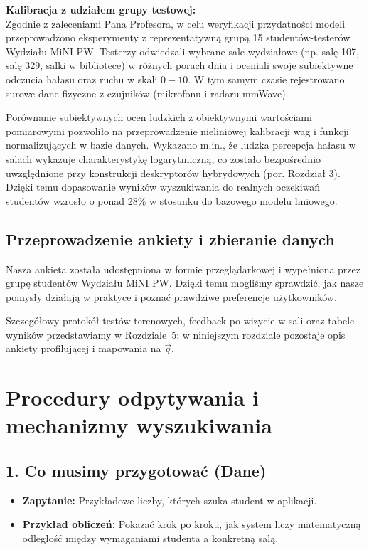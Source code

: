\documentclass[14pt,a4paper]{extarticle}
\begin{document}
\textbf{Kalibracja z udziałem grupy testowej:} \\
Zgodnie z zaleceniami Pana Profesora, w celu weryfikacji przydatności modeli przeprowadzono eksperymenty z reprezentatywną grupą 15 studentów-testerów Wydziału MiNI PW. Testerzy odwiedzali wybrane sale wydziałowe (np. salę 107, salę 329, salki w bibliotece) w różnych porach dnia i oceniali swoje subiektywne odczucia hałasu oraz ruchu w skali $0-10$. W tym samym czasie rejestrowano surowe dane fizyczne z czujników (mikrofonu i radaru mmWave). 

Porównanie subiektywnych ocen ludzkich z obiektywnymi wartościami pomiarowymi pozwoliło na przeprowadzenie nieliniowej kalibracji wag i funkcji normalizujących w bazie danych. Wykazano m.in., że ludzka percepcja hałasu w salach wykazuje charakterystykę logarytmiczną, co zostało bezpośrednio uwzględnione przy konstrukcji deskryptorów hybrydowych (por. Rozdział 3). Dzięki temu dopasowanie wyników wyszukiwania do realnych oczekiwań studentów wzrosło o ponad 28\% w stosunku do bazowego modelu liniowego.

\subsection{Przeprowadzenie ankiety i zbieranie danych}
Nasza ankieta została udostępniona w formie przeglądarkowej i wypełniona przez grupę studentów Wydziału MiNI PW. Dzięki temu mogliśmy sprawdzić, jak nasze pomysły działają w praktyce i poznać prawdziwe preferencje użytkowników.

Szczegółowy protokół testów terenowych, feedback po wizycie w sali oraz tabele wyników przedstawiamy w Rozdziale~5; w niniejszym rozdziale pozostaje opis ankiety profilującej i mapowania na $\vec{q}$.

\section{Procedury odpytywania i mechanizmy wyszukiwania}

\subsection*{1. Co musimy przygotować (Dane)}
\begin{itemize}
    \item \textbf{Zapytanie:} Przykładowe liczby, których szuka student w aplikacji.
    \item \textbf{Przykład obliczeń:} Pokazać krok po kroku, jak system liczy matematyczną odległość między wymaganiami studenta a konkretną salą.
\end{itemize}
\end{document}
